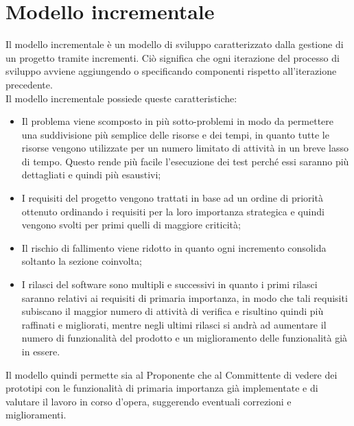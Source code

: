 \section{Modello incrementale}
Il modello incrementale è un modello di sviluppo caratterizzato dalla gestione di un progetto tramite incrementi. Ciò significa che ogni iterazione del processo di sviluppo avviene aggiungendo o specificando componenti rispetto all'iterazione precedente.\\
Il modello incrementale possiede queste caratteristiche: 
\begin{itemize}
\item Il problema viene scomposto in più sotto-problemi in modo da permettere una suddivisione più semplice delle risorse e dei tempi, in quanto tutte le risorse vengono utilizzate per un numero limitato di attività in un breve lasso di tempo. Questo rende più facile l'esecuzione dei test perché essi saranno più dettagliati e quindi più esaustivi;
\item I requisiti del progetto vengono trattati in base ad un ordine di priorità ottenuto ordinando i requisiti per la loro importanza strategica e quindi vengono svolti per primi quelli di maggiore criticità;
\item Il rischio di fallimento viene ridotto in quanto ogni incremento consolida soltanto la sezione coinvolta;
\item I rilasci del software sono multipli e successivi in quanto i primi rilasci saranno relativi ai requisiti di primaria importanza, in modo che tali requisiti subiscano il maggior numero di attività di verifica e risultino quindi più raffinati e migliorati, mentre negli ultimi rilasci si andrà ad aumentare il numero di funzionalità del prodotto e un miglioramento delle funzionalità già in essere.
\end{itemize}
Il modello quindi permette sia al Proponente che al Committente di vedere dei prototipi con le funzionalità di primaria importanza già implementate e di valutare il lavoro in corso d'opera, suggerendo eventuali correzioni e miglioramenti.



